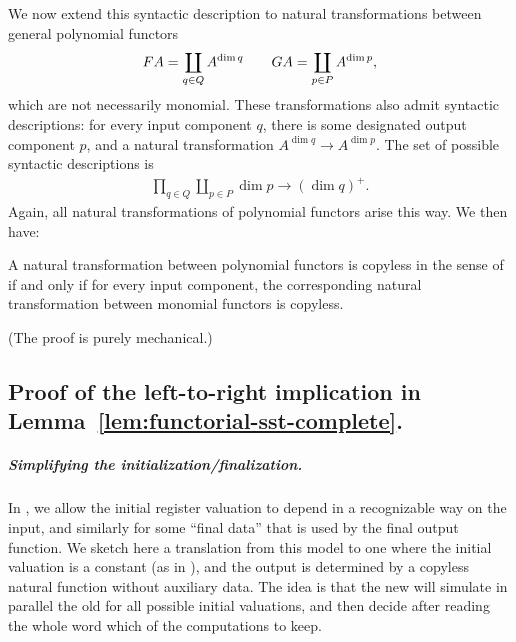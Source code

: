 We now extend this syntactic description to natural transformations between general polynomial functors 
\begin{align*}
\functor A = \coprod_{q \in Q} A^{\dim q} \qquad 
\functorg A = \coprod_{p \in P} A^{\dim p},
\end{align*}
which are not necessarily monomial. These transformations also admit syntactic descriptions: for every input component $q$, there is some designated output component $p$, and a natural transformation $A^{\dim q} \to A^{\dim p}$.  The set of possible syntactic descriptions is
\begin{align*}
\prod_{q \in Q} \coprod_{p \in P} \dim p \to (\dim q)^+.
\end{align*}
Again, all natural transformations of polynomial functors arise this way.
We then have:
\begin{claim}
  A natural transformation between polynomial functors is copyless in the sense of  if and only if for every input component, the corresponding natural transformation between monomial functors is copyless.
\end{claim}

(The proof is purely mechanical.)

\subsection{Proof of the left-to-right implication in Lemma~\ref{lem:functorial-sst-complete}.}

\subparagraph{Simplifying the initialization/finalization.}

In , we allow the initial register valuation to depend in a recognizable way on the input, and similarly for some \enquote{final data} that is used by the final output function. We sketch here a translation from this model to one where the initial valuation is a constant (as in ), and the output is determined by a copyless natural function without auxiliary data. The idea is that the new \sst will simulate in parallel the old \sst for all possible initial valuations, and then decide after reading the whole word which of the computations to keep.

